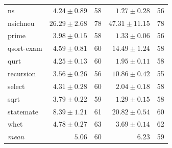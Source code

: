 \begin{table}[t]
\begin{tabular}{lrrrr}
    ns & $4.24 \pm 0.89$ & 58 & $1.27 \pm 0.28$ & 56 \\
    nsichneu & $26.29 \pm 2.68$ & 78 & $47.31 \pm 11.15$ & 78 \\
    prime & $3.98 \pm 0.15$ & 58 & $1.33 \pm 0.06$ & 56 \\
    qsort-exam & $4.59 \pm 0.81$ & 60 & $14.49 \pm 1.24$ & 58 \\
    qurt & $4.25 \pm 0.13$ & 60 & $1.95 \pm 0.11$ & 58 \\
    recursion & $3.56 \pm 0.26$ & 56 & $10.86 \pm 0.42$ & 55 \\
    select & $4.31 \pm 0.28$ & 60 & $2.04 \pm 0.18$ & 58 \\
    sqrt & $3.79 \pm 0.22$ & 59 & $1.29 \pm 0.15$ & 58 \\
    statemate & $8.39 \pm 1.21$ & 61 & $20.82 \pm 0.54$ & 60 \\
    whet & $4.78 \pm 0.27$ & 63 & $3.69 \pm 0.14$ & 62 \\
    \midrule
    \textit{mean} & $5.06$ & 60 & $6.23$ & 59 \\
    \bottomrule
  \end{tabular}
\end{table}
